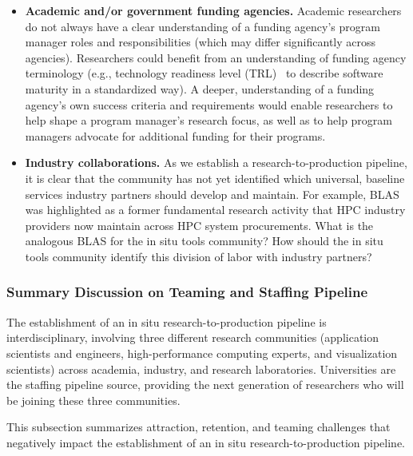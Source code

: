 \begin{refsection}
\begin{itemize}
\item \textbf{\sffamily Academic and/or government funding agencies.} Academic researchers do not always have a clear understanding of a funding agency’s program manager roles and responsibilities (which may differ significantly across agencies).  Researchers could benefit from an understanding of funding agency terminology (e.g., technology readiness level (TRL)~\cite{TRL} to describe software maturity in a standardized way).  A deeper, understanding of a funding agency’s own success criteria and requirements would enable researchers to help shape a program manager’s research focus, as well as to help program managers  advocate for additional  funding for their programs.
 \item \textbf{\sffamily Industry collaborations.}  As we establish a research-to-production pipeline, it is clear that the community has not yet identified which universal, baseline services industry partners should develop and maintain.  For example, BLAS was highlighted as a former fundamental research activity that HPC industry providers now maintain across HPC system procurements.  What is the analogous BLAS for the in situ tools community? How should the in situ tools community identify this division of labor with industry partners?
\end{itemize}

\printbibliography	
\end{refsection}


\subsubsection{Summary Discussion on Teaming and Staffing Pipeline}

The establishment of an in situ research-to-production pipeline is interdisciplinary, involving three different research communities (application scientists and engineers, high-performance computing experts, and visualization scientists)  across academia, industry, and research laboratories.  Universities are the staffing pipeline source, providing the next generation of researchers who will be joining these three communities. 

This subsection summarizes attraction, retention, and teaming challenges that negatively impact the establishment of an in situ research-to-production pipeline.

